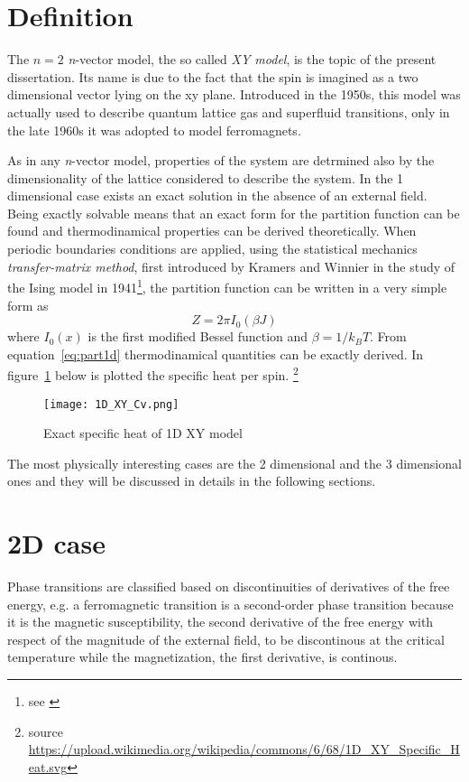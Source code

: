 \section{Definition}

The $n=2$ \textit{n}-vector model, the so called \emph{XY model}, is the topic of
the present dissertation. Its name is due to the fact that the spin
is imagined as a two dimensional vector lying on the xy plane. Introduced in the
1950s, this model was actually used to describe quantum lattice gas and superfluid 
transitions, only in the late 1960s it was adopted to model ferromagnets.

As in any \textit{n}-vector model, properties of the system are detrmined also
by the dimensionality of the lattice considered to describe the system. In the 1 
dimensional case exists an exact solution in the absence of an external
field. Being exactly solvable means that an exact form for the partition function can
be found and thermodinamical properties can be derived theoretically. When 
periodic boundaries conditions are applied, using the statistical mechanics 
\emph{transfer-matrix method}, first introduced by Kramers and Winnier in the
study of the Ising model in 1941\footnote{see \cite{Kramers1941}}, the 
partition function can be written in a very simple form as 
\begin{equation}
\label{eq:part1d}
Z = 2\pi I_0(\beta J)
\end{equation}
where $I_0(x)$ is the first modified Bessel function and $\beta = 1/k_B T$.
From equation~\ref{eq:part1d} thermodinamical quantities can be exactly derived.
In figure~\ref{fig:1D_XY} below is plotted the specific heat per spin.
\footnote{source 
\url{https://upload.wikimedia.org/wikipedia/commons/6/68/1D_XY_Specific_Heat.svg}} 

\begin{figure}
\label{fig:1D_XY}
\centering
\texttt{[image: 1D\_XY\_Cv.png]}
\caption{Exact specific heat of 1D XY model}
\end{figure}

The most physically interesting cases are the 2 dimensional and the 3 dimensional
ones and they will be discussed in details in the following sections.


\section{2D case}

Phase transitions are classified based on discontinuities of derivatives of the 
free energy, e.g. a ferromagnetic transition is a second-order phase transition 
because it is the magnetic susceptibility, the second derivative of the free energy
with respect of the magnitude of the external field, to be discontinous at the 
critical temperature while the magnetization, the first derivative, is continous.

